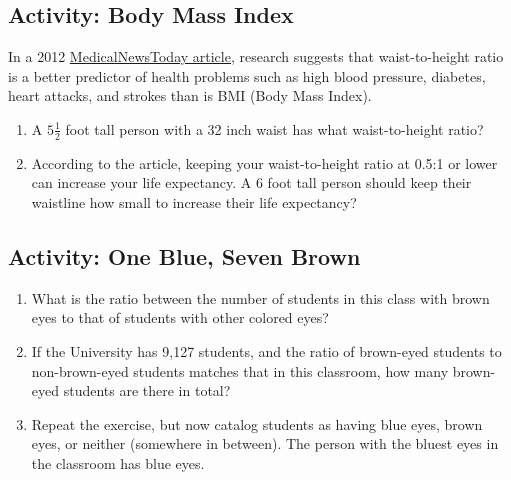 \wbnewpage
\subsection{Activity: Body Mass Index}
In a 2012 \href{https://www.medicalnewstoday.com/articles/245328#1}{MedicalNewsToday article}, research suggests that waist-to-height ratio is a better predictor of health problems such as high blood pressure, diabetes, heart attacks, and strokes than is BMI (Body Mass Index).
\begin{enumerate}
\item A $5\frac12$ foot tall person with a 32 inch waist has what waist-to-height ratio?\wbvfill
\item According to the article, keeping your waist-to-height ratio at 0.5:1 or lower can increase your life expectancy. A 6 foot tall person should keep their waistline how small to increase their life expectancy?\wbvfill
\end{enumerate}

\subsection{Activity: One Blue, Seven Brown}
\begin{enumerate}
\item What is the ratio between the number of students in this class with brown eyes to that of students with other colored eyes?\wbvfill
\item If the University has 9,127 students, and the ratio of brown-eyed students to non-brown-eyed students matches that in this classroom, how many brown-eyed students are there in total? \wbvfill
\item Repeat the exercise, but now catalog students as having blue eyes, brown eyes, or neither (somewhere in between). The person with the bluest eyes in the classroom has blue eyes. \wbvfill\wbvfill
\end{enumerate}

\wbnewpage
